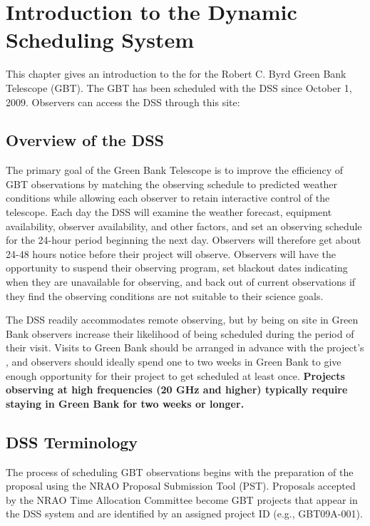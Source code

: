 \chapter{Introduction to the Dynamic Scheduling System}\label{chap:dss}
This chapter gives an introduction to the  for the Robert C.
Byrd Green Bank Telescope (\gls{GBT}). The \gls{GBT} has been scheduled with the
\gls{DSS} since October 1, 2009. Observers can access the \gls{DSS} through this site:

\section{Overview of the DSS}
The primary goal of the Green Bank Telescope  is to improve the
efficiency of \gls{GBT} observations by matching the observing schedule to
predicted weather conditions while allowing each observer to retain interactive
control of the telescope. Each day the \gls{DSS} will examine the weather forecast,
equipment availability, observer availability, and other factors, and set an
observing schedule for the 24-hour period beginning the next day. Observers will
therefore get about 24-48 hours notice before their project will observe.
Observers will have the opportunity to suspend their observing program, set
blackout dates indicating when they are unavailable for observing, and back out of
current observations if they find the observing conditions are not suitable to
their science goals.

The \gls{DSS} readily accommodates remote observing, but by being on site in
Green Bank observers increase their likelihood of being scheduled during the
period of their visit. Visits to Green Bank should be arranged in advance with
the project's , and observers should ideally spend one to two weeks
in Green Bank to give enough opportunity for their project to get scheduled at
least once. {\bf Projects observing at high frequencies (20 GHz and higher)
typically require staying in Green Bank for two weeks or longer.}


\section{DSS Terminology}

The process of scheduling \gls{GBT} observations begins with the preparation of
the proposal using the \gls{NRAO} Proposal Submission Tool (PST). Proposals accepted
by the \gls{NRAO} Time Allocation Committee become \gls{GBT} projects that appear
in the \gls{DSS} system and are identified by an assigned project ID
(e.g., GBT09A-001).

